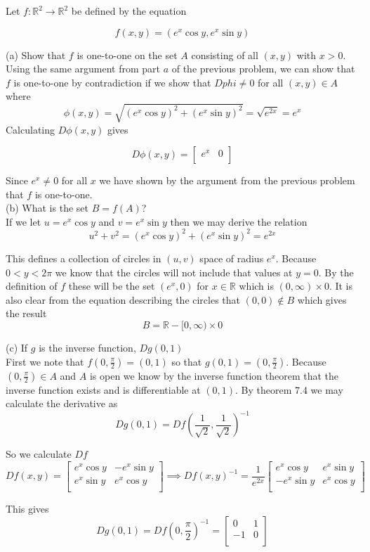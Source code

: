 \documentclass[11pt,reqno]{article}
\begin{document}
\noindent Let $f : \mathbb{R}^2 \to \mathbb{R}^2$ be defined by the equation

\[ f(x,y) = (e^x \cos y, e^x \sin y) \]

\noindent (a) Show that $f$ is one-to-one on the set $A$ consisting of all $(x,y)$ with $x > 0$. \\

Using the same argument from part $a$ of the previous problem, we can show that $f$ is one-to-one by contradiction if we show that $D phi \neq 0$ for all $(x,y) \in A$ where 
\[ \phi(x,y) = \sqrt{ (e^x \cos y)^2 + (e^x \sin y)^2 } = \sqrt{e^{2x}} = e^x \]
\noindent Calculating $D \phi(x,y)$ gives

\[ D \phi(x,y) = \left[ \begin{array}{cc}
e^x & 0 \\
\end{array} \right] \]

Since $e^x \neq 0$ for all $x$ we have shown by the argument from the previous problem that $f$ is one-to-one.\\

\noindent (b) What is the set $B = f(A)$?\\

If we let $u = e^x \cos y$ and $v = e^x \sin y$ then we may derive the relation
\[ u^2 + v^2 = (e^x \cos y)^2 + (e^x \sin y)^2 = e^{2x} \]

This defines a collection of circles in $(u,v)$ space of radius $e^x$. Because $0 < y < 2 \pi$ we know that the circles will not include that values at $y = 0$. By the definition of $f$ these will be the set $(e^x,0)$ for $x \in \mathbb{R}$ which is $(0,\infty) \times 0$. It is also clear from the equation describing the circles that $(0,0) \notin B$ which gives the result 
\[ B = \mathbb{R} - [0,\infty) \times 0 \]

\noindent (c) If $g$ is the inverse function, $D g(0,1)$\\

First we note that $f(0,\frac{\pi}{2}) = (0,1)$ so that $g(0,1) = (0,\frac{\pi}{2})$. Because $(0,\frac{\pi}{2}) \in A$ and $A$ is open we know by the inverse function theorem that the inverse function exists and is differentiable at $(0,1)$. By theorem 7.4 we may calculate the derivative as
\[ D g(0,1) = D f(\frac{1}{\sqrt{2}},\frac{1}{\sqrt{2}})^{-1} \]


\noindent So we calculate $D f$
\[ D f(x,y) = \left[ \begin{array}{cc}
e^x \cos y & - e^x \sin y \\
e^x \sin y & e^x \cos y \\
\end{array} \right] \implies D f(x,y)^{-1} = \frac{1}{e^{2x}} \left[ \begin{array}{cc}
e^x \cos y & e^x \sin y \\
-e^x \sin y & e^x \cos y \\
\end{array} \right] \]

\noindent This gives 
\[ D g(0,1) = D f(0,\frac{\pi}{2})^{-1} =  \left[ \begin{array}{cc}
0 & 1 \\
-1 & 0 \\
\end{array} \right] \]
\end{document}
